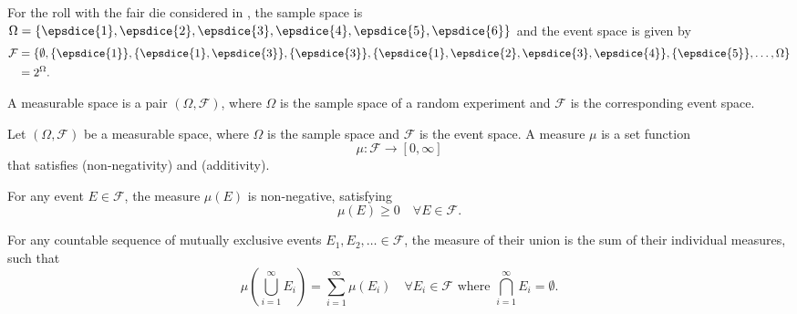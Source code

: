 \begin{example}
	\label{ex:die2}
	For the roll with the fair die considered in , the sample space is $\Omega = \{ \epsdice{1}, \epsdice{2}, \epsdice{3}, \epsdice{4}, \epsdice{5}, \epsdice{6} \}$ and the event space is given by
	\begin{equation}
		\begin{split}
			\mathcal{F}&=\{\emptyset, \{\epsdice{1}\},\{\epsdice{1},\epsdice{3}\},\{\epsdice{3}\},\{\epsdice{1},\epsdice{2},\epsdice{3},\epsdice{4}\},\{\epsdice{5}\},\dots,\Omega\}\\
			& = 2^\Omega.
		\end{split}
	\end{equation}
\end{example}

\begin{definition}
	\label{def:measurable_space}
	A measurable space is a pair $(\Omega, \mathcal{F})$, where $\Omega$ is the sample space of a random experiment and $\mathcal{F}$ is the corresponding event space.
\end{definition}

\begin{definition}[Measure]
	\label{def:measure}
	Let $(\Omega, \mathcal{F})$ be a measurable space, where $\Omega$ is the sample space and $\mathcal{F}$ is the event space. A measure $\mu$ is a set function
	\begin{equation}
		\mu\colon \mathcal{F} \to [0,\infty]
	\end{equation}
	that satisfies  (non-negativity) and  (additivity).
\end{definition}

\begin{axiom}
	\label{ax:non_neg}
	For any event $E\in \mathcal{F}$, the measure $\mu(E)$ is non-negative, satisfying
	\begin{equation}
		\mu(E) \geq 0 \quad \forall E \in  \mathcal{F}.
	\end{equation}
\end{axiom}

\begin{axiom}[Additivity]
	\label{ax:add}
	For any countable sequence of mutually exclusive events $E_1, E_2, \ldots\in \mathcal{F}$, the measure of their union is the sum of their individual measures, such that
	\begin{equation}
		\mu\left(\bigcup_{i=1}^{\infty} \mathit{E}_i\right) = \sum_{i=1}^{\infty} \mu(\mathit{E}_i) \quad \forall \mathit{E}_i \in \mathcal{F} \text{ where } \bigcap_{i=1}^{\infty} \mathit{E}_i = \emptyset.
	\end{equation}
\end{axiom}

